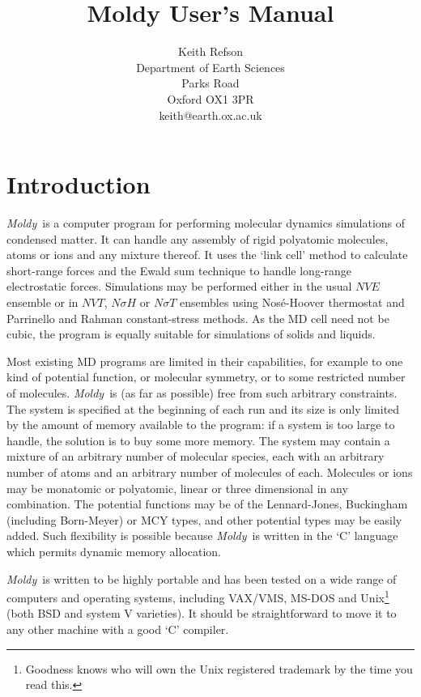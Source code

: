 \documentclass[twoside]{report}
\title{{\Huge Moldy User's Manual}\\ \RCSrevision}
\author{Keith Refson\\Department of Earth Sciences\\Parks Road
\\Oxford OX1 3PR\\keith@earth.ox.ac.uk\\}
\newcommand{\moldy}{{\em Moldy}}
\begin{document}
\maketitle
\tableofcontents

\chapter{Introduction}   %

\moldy\ is a computer program for performing molecular dynamics
simulations of condensed matter.  It can handle any assembly of rigid
polyatomic molecules, atoms or ions and any mixture thereof. It uses
the `link cell' method to calculate short-range forces and the Ewald
sum technique to handle long-range electrostatic forces.  Simulations
may be performed either in the usual $NVE$ ensemble or in $NVT$,
$N\sigma H$ or $N\sigma T$ ensembles using Nos\'e-Hoover thermostat and
Parrinello and Rahman constant-stress methods. As the MD cell need not
be cubic, the program is equally suitable for simulations of solids
and liquids.

Most existing MD programs are limited in their capabilities, for
example to one kind of potential function, or molecular symmetry, or
to some restricted number of molecules.  \moldy\  is (as far as
possible) free from such arbitrary constraints.  The system is
specified at the beginning of each run and its size is only limited by
the amount of memory available to the program: if a system is too
large to handle, the solution is to buy some more memory.  The system
may contain a mixture of an arbitrary number of molecular species,
each with an arbitrary number of atoms and an arbitrary number of
molecules of each. Molecules or ions may be monatomic or polyatomic,
linear or three dimensional in any combination.  The potential
functions may be of the Lennard-Jones, Buckingham (including
Born-Meyer) or MCY types, and other potential types may be easily
added.  Such flexibility is possible because \moldy\  is written in the
`C' language which permits dynamic memory allocation.

\moldy\  is written to be highly portable and has been tested on a wide
range of computers and operating systems, including VAX/VMS,
MS-DOS and Unix\footnote{Goodness knows who will own the Unix
registered trademark by the time you read this.}  (both BSD and system V
varieties).  It should be straightforward to move it to any other
machine with a good `C' compiler.
\end{document}

